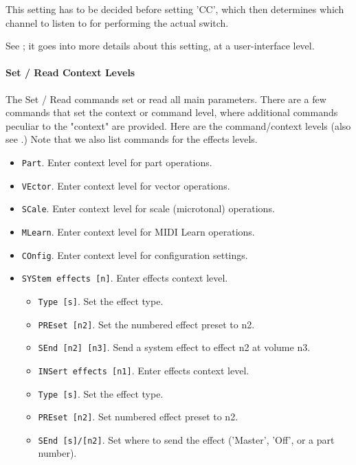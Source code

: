    This setting has to be decided before setting 'CC', which then determines
   which channel to listen to for performing the actual switch.

   See ; it goes into more details about
   this setting, at a user-interface level.

\paragraph{Set / Read Context Levels}
\label{paragraph:command_line_context_levels}

   The Set / Read commands set or read all main parameters.  There are a few
   commands that set the context or command level, where additional commands
   peculiar to the "context" are provided.  Here are the command/context levels
   (also see .)
   Note that we also list commands for the effects levels.

   \begin{itemize}
      \item \texttt{Part}. Enter context level for part operations.
      \item \texttt{VEctor}. Enter context level for vector operations.
      \item \texttt{SCale}. Enter context level for scale (microtonal) operations.
      \item \texttt{MLearn}. Enter context level for MIDI Learn operations.
      \item \texttt{COnfig}. Enter context level for configuration settings.
      \item \texttt{SYStem effects [n]}. Enter effects context level.
      \begin{itemize}
         \item \texttt{Type [s]}.  Set the effect type.
         \item \texttt{PREset [n2]}. Set the numbered effect preset to n2.
         \item \texttt{SEnd [n2] [n3]}. Send a system effect to effect n2
            at volume n3.
      \end{itemize}
      \begin{itemize}
   \item \texttt{INSert effects [n1]}. Enter effects context level.
         \item \texttt{Type [s]}. Set the effect type.
         \item \texttt{PREset [n2]}. Set numbered effect preset to n2.
         \item \texttt{SEnd [s]/[n2]}. Set where to send the effect
            ('Master', 'Off', or a part number).
      \end{itemize}
   \end{itemize}

